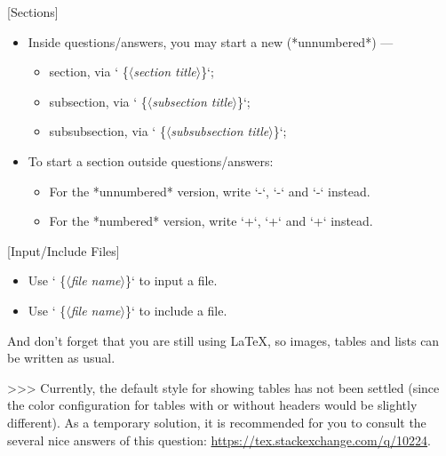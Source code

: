 \documentclass[%
  use style = classical,
  scroll,
]{Q-and-A}
\newcommand{\meta}[1]{$\langle${\normalfont\itshape#1}$\rangle$}
\begin{document}
  [Sections]
  \begin{itemize}
    \item Inside questions/answers, you may start a new (*unnumbered*) ---
    \begin{itemize}
      \item section, via `\textsharp\textsharp{} \{\meta{section title}\}`;
      \item subsection, via `\textsharp\textsharp\textsharp{} \{\meta{subsection title}\}`;
      \item subsubsection, via `\textsharp\textsharp\textsharp\textsharp{} \{\meta{subsubsection title}\}`;
    \end{itemize}
    \item To start a section outside questions/answers:
    \begin{itemize}
      \item For the *unnumbered* version, write `\textsharp\textsharp-`, `\textsharp\textsharp\textsharp-` and `\textsharp\textsharp\textsharp\textsharp-` instead.
      \item For the *numbered* version, write `\textsharp\textsharp+`, `\textsharp\textsharp\textsharp+` and `\textsharp\textsharp\textsharp\textsharp+` instead.
    \end{itemize}
  \end{itemize}

  [Input/Include Files]
  \begin{itemize}
    \item Use `\textcolon\textcolon{} \{\meta{file name}\}` to input a file.
    \item Use `\textcolon\textcolon\textcolon{} \{\meta{file name}\}` to include a file.
  \end{itemize}

  \medskip

  And don't forget that you are still using \LaTeX, so images, tables and lists can be written as usual.

  \medskip

  >>> Currently, the default style for showing tables has not been settled (since the color configuration for tables with or without headers would be slightly different). As a temporary solution, it is recommended for you to consult the several nice answers of this question: \url{https://tex.stackexchange.com/q/10224}.
\end{document}
